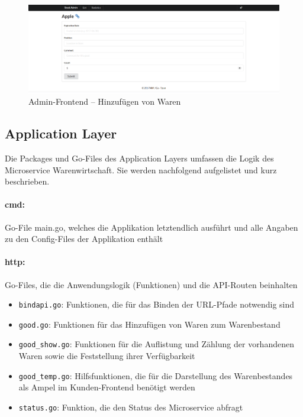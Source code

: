 \begin{figure}[H]
	\centering
	\includegraphics[width=0.75 \textwidth]{./pics/add.png}
	\caption{Admin-Frontend -- Hinzufügen von Waren}
	\label{pic:Admin-Frontend -- Hinzufuegen von Waren}
\end{figure}


\newpage
\subsection{Application Layer}
\label{subsec: Application Layer}
Die Packages und Go-Files des Application Layers umfassen die Logik des Microservice Warenwirtschaft. Sie werden nachfolgend aufgelistet und kurz beschrieben.

\paragraph{cmd:} Go-File main.go, welches die Applikation letztendlich ausführt und alle Angaben zu den Config-Files der Applikation enthält

\paragraph{http:} Go-Files, die die Anwendungslogik (Funktionen) und die API-Routen beinhalten
	\begin{itemize}
	\item \texttt{bindapi.go}: Funktionen, die für das Binden der URL-Pfade notwendig sind
	\item \texttt{good.go}: Funktionen für das Hinzufügen von Waren zum Warenbestand
	\item \texttt{good\_show.go}: Funktionen für die Auflistung und Zählung der vorhandenen Waren sowie die Feststellung ihrer Verfügbarkeit
	\item \texttt{good\_temp.go}: Hilfsfunktionen, die für die Darstellung des Warenbestandes als Ampel im Kunden-Frontend benötigt werden
	\item \texttt{status.go}: Funktion, die den Status des Microservice abfragt 
	\end{itemize}


